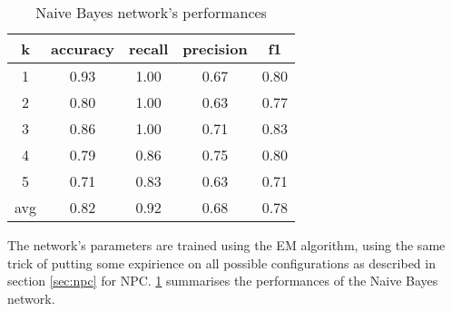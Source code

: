 \begin{table}
	\centering
	\caption{Naive Bayes network's performances}
	\label{tab:naive}
	\begin{tabular}{ccccc}
    	\toprule
    	    \multicolumn{1}{c}{k} &
    		\multicolumn{1}{c}{accuracy} &
    		\multicolumn{1}{c}{recall} &
    		\multicolumn{1}{c}{precision} &
    		\multicolumn{1}{c}{f1} \\
    	\midrule
    		1   & 0.93 & 1.00 & 0.67 & 0.80 \\
    		2   & 0.80 & 1.00 & 0.63 & 0.77 \\
    		3   & 0.86 & 1.00 & 0.71 & 0.83 \\
    		4   & 0.79 & 0.86 & 0.75 & 0.80 \\
    		5   & 0.71 & 0.83 & 0.63 & 0.71 \\[2pt]
    		\hline
    		avg & 0.82 & 0.92 & 0.68 & 0.78 \Tstrut\Bstrut\\
    	\bottomrule    
	\end{tabular}
\end{table}

The network's parameters are trained using the \ac{EM} algorithm, using the same trick of putting some expirience on all possible configurations as described in section \cref{sec:npc} for NPC. \cref{tab:naive} summarises the performances of the Naive Bayes network.
